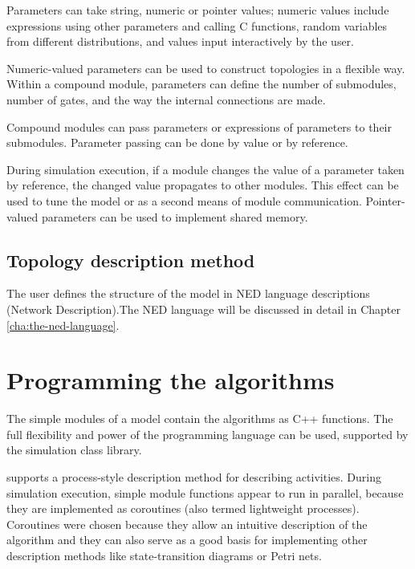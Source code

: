 Parameters can take string, numeric or pointer values; numeric 
values include expressions using other parameters and calling 
C functions, random variables from different distributions, and 
values input interactively by the user.


Numeric-valued parameters can be used to construct topologies in a
flexible way. Within a compound module, parameters can define the
number of submodules, number of gates, and the way the internal
connections are made.


Compound modules can pass parameters or expressions of parameters 
to their submodules. Parameter passing can be done by value or 
by reference.

During simulation execution, if a module changes the value of 
a parameter taken by reference, the changed value propagates 
to other modules. This effect can be used to tune the model or 
as a second means of module communication. Pointer-valued parameters 
can be used to implement shared memory.


\subsection{Topology description method}
The user defines the structure of the model in NED language descriptions 
(Network Description).The NED language will be discussed in detail 
in Chapter \ref{cha:the-ned-language}.


\section{Programming the algorithms}

The simple modules of a model contain the algorithms as C++ functions. 
The full flexibility and power of the programming language can 
be used, supported by the {\opp} simulation class library.


{\opp} supports a process-style description method for describing 
activities. During simulation execution, simple module functions 
appear to run in parallel, because they are implemented as coroutines 
(also termed lightweight processes). Coroutines were chosen because 
they allow an intuitive description of the algorithm and they 
can also serve as a good basis for implementing other description 
methods like state-transition diagrams or Petri nets.

